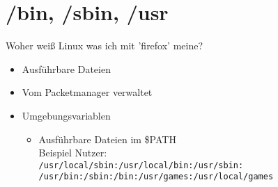 \section[/(s)bin, /usr]{/bin, /sbin, /usr}
\begin{frame}{Woher weiß Linux was ich mit 'firefox' meine?}
\begin{itemize}
\item Ausführbare Dateien
\item Vom Packetmanager verwaltet
\item Umgebungsvariablen
\begin{itemize}
\item Ausführbare Dateien im \$PATH \\
Beispiel Nutzer: \\
\texttt{\scriptsize /usr/local/sbin:/usr/local/bin:/usr/sbin:
/usr/bin:/sbin:/bin:/usr/games:/usr/local/games}
\end{itemize}
\end{itemize}
\end{frame}